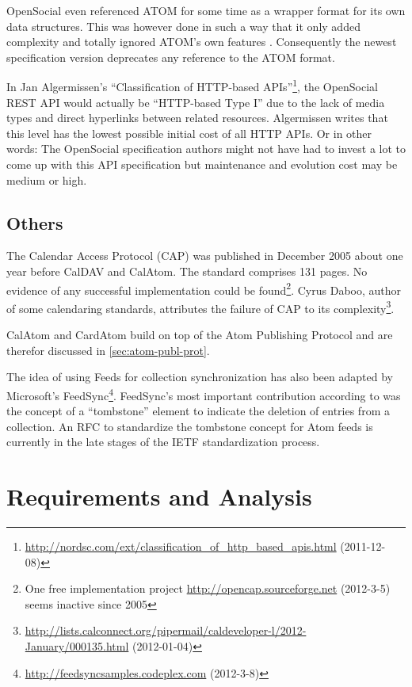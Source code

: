 \documentclass[11pt,a4paper,headsepline,twoside]{scrartcl}		%
\newcommand{\citeurl}[2]{\url{#1} (#2)}
\begin{document}
OpenSocial even referenced ATOM for some time as a wrapper format for its own
data structures. This was however done in such a way that it only added
complexity and totally ignored ATOM's own
features \cite{dehora2009}. Consequently the newest specification version
deprecates any reference to the ATOM format.

In Jan Algermissen's ``Classification of HTTP-based
APIs''\footnote{\citeurl{http://nordsc.com/ext/classification_of_http_based_apis.html}{2011-12-08}},
the OpenSocial REST API would actually be ``HTTP-based Type I'' due to the lack
of media types and direct hyperlinks between related resources. Algermissen
writes that this level has the lowest possible initial cost of all HTTP APIs. Or
in other words: The OpenSocial specification authors might not have had to
invest a lot to come up with this API specification but maintenance and
evolution cost may be medium or high.

\subsection{Others}

The Calendar Access Protocol (CAP) \cite{RFC4324} was published in December 2005
about one year before CalDAV and CalAtom. The standard comprises 131 pages. No
evidence of any successful implementation could be found\footnote{One free
  implementation project \citeurl{http://opencap.sourceforge.net}{2012-3-5}
  seems inactive since 2005}. Cyrus Daboo, author of some calendaring standards,
attributes the failure of CAP to its
complexity\footnote{\citeurl{http://lists.calconnect.org/pipermail/caldeveloper-l/2012-January/000135.html}{2012-01-04}}.

CalAtom and CardAtom build on top of the Atom Publishing Protocol and are
therefor discussed in \autoref{sec:atom-publ-prot}.

The idea of using Feeds for collection synchronization has also been adapted by
Microsoft's
FeedSync\footnote{\citeurl{http://feedsyncsamples.codeplex.com}{2012-3-8}}. FeedSync's
most important contribution according to \cite{Snell2007} was the concept of a
``tombstone'' element to indicate the deletion of entries from a collection. An
RFC to standardize the tombstone concept \cite{draft-snell-atompub-tombstones-14}
for Atom feeds is currently in the late stages of the IETF standardization
process.

\section{Requirements and Analysis}
\label{sec:requ-analys}
\end{document}
